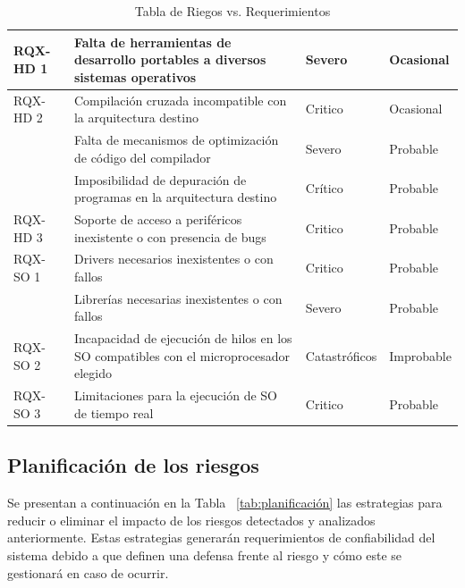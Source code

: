 \begin{table}[!h]
\begin{tabular}{ p{2.5cm} p{9cm} p{2cm} p{2cm} }
		\hline
		RQX-HD 1& Falta de herramientas de desarrollo portables a diversos sistemas operativos & Severo  &  Ocasional\\
		\hline		
		RQX-HD 2& Compilación cruzada incompatible con la arquitectura destino  & Critico &  Ocasional\\
		\hline
				& Falta de mecanismos de optimización de código del compilador  & Severo  &  Probable\\
		\hline
				& Imposibilidad de depuración de programas en la arquitectura destino& Crítico  &  Probable\\
		\hline
		RQX-HD 3& Soporte de acceso a periféricos inexistente o con presencia de bugs & Critico &  Probable\\
		\hline
		RQX-SO 1& Drivers necesarios inexistentes o con fallos & Critico &  Probable\\
		\hline
				& Librerías necesarias inexistentes o con fallos & Severo &  Probable\\
		\hline
		RQX-SO 2& Incapacidad de ejecución de hilos en los SO compatibles con el microprocesador elegido & Catastróficos & Improbable\\
		\hline
		RQX-SO 3& Limitaciones para la ejecución de SO de tiempo real & Critico & Probable\\
		\hline
		\end{tabular}
		\caption{Tabla de Riegos vs. Requerimientos}
		\label{tab:riegos}
		\end{table}
		
	\newpage
	\subsection{Planificación de los riesgos}	

Se presentan a continuación en la Tabla ~\ref {tab:planificación} las estrategias para reducir o eliminar el impacto de los riesgos detectados y analizados anteriormente. Estas estrategias generarán requerimientos de confiabilidad del sistema debido a que definen una defensa frente al riesgo y cómo este se gestionará en caso de ocurrir.

